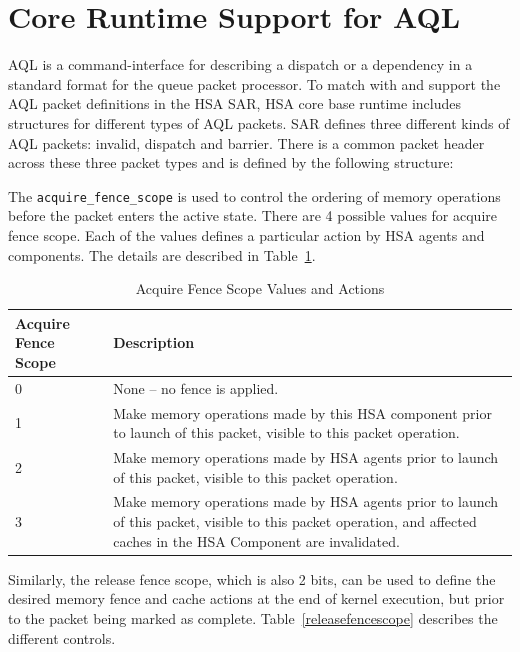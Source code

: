 \hypertarget{coreapi_AQL}{}\section{Core Runtime Support for
AQL}\label{AQL}
AQL is a command-interface for describing a dispatch or a dependency
in a standard format for the queue packet processor. 
To match with and support the AQL packet definitions in the HSA SAR,
HSA core base runtime includes structures for different types of AQL
packets.  SAR defines three different kinds of AQL packets: invalid,
dispatch and barrier.  There is a common packet header across these
three packet types and is defined by the following structure:



The \texttt{acquire\_fence\_scope} is used to control the ordering
of memory operations before the packet enters the active state.
There are 4 possible values for acquire fence scope. Each of the
values defines a particular action by HSA agents and components. The
details are described in Table~\ref{acquirefencescope}.

\begin{table}
  \begin{center}
          \begin{tabular}{|p{1in}|p{5in}|}
      \hline
      \textbf{Acquire Fence Scope} &\textbf{Description} \\ 
      \hline
      0	& None -- no fence is applied. \\
      \hline
      1	& Make memory operations made by this HSA component prior to
      launch of this packet, visible to this packet operation.\\
      \hline
      2	& Make memory operations made by HSA agents prior to launch
      of this packet, visible to this packet operation.\\
      \hline
      3	& Make memory operations made by HSA agents prior to launch
      of this packet, visible to this packet operation, and affected
      caches in the HSA Component are invalidated.\\
      \hline
    \end{tabular}
  \end{center}
  \caption{Acquire Fence Scope Values and Actions}
  \label{acquirefencescope}
\end{table}

Similarly, the release fence scope, which is also 2 bits, can be
used to define the desired memory fence and cache actions at the
end of kernel execution, but prior to the packet being marked as
complete. Table~\ref{releasefencescope} describes the different
controls.

